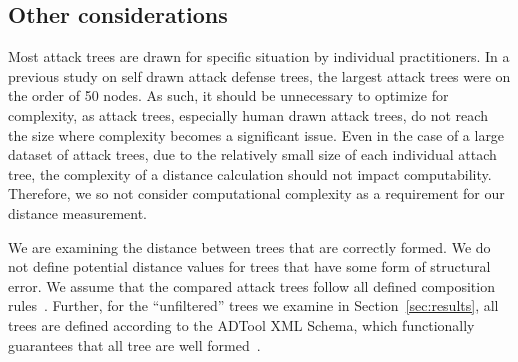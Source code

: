 % 



\subsection{Other considerations}

Most attack trees are drawn for specific situation by individual practitioners. In a previous study on self drawn attack defense trees, the largest attack trees were on the order of 50 nodes. As such, it should be unnecessary to optimize for complexity, as attack trees, especially human drawn attack trees, do not reach the size where complexity becomes a significant issue. Even in the case of a large dataset of attack trees, due to the relatively small size of each individual attach tree, the complexity of a distance calculation should not impact computability. Therefore, we so not consider computational complexity as a requirement for our distance measurement.

We are examining the distance between trees that are correctly formed. We do not define potential distance values for trees that have some form of structural error. We assume that the compared attack trees follow all defined composition rules~\cite{mauw_foundations_2006}. Further, for the ``unfiltered'' trees we examine in Section~\ref{sec:results}, all trees are defined according to the ADTool XML Schema, which functionally guarantees that all tree are well formed~\cite{kordy_adtool_2013}.





















